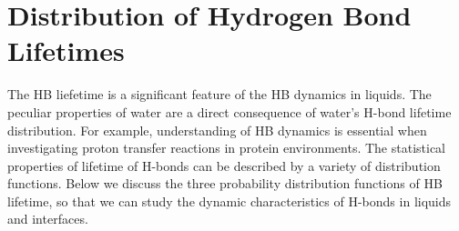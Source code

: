 \section{Distribution of Hydrogen Bond Lifetimes}
The HB liefetime is a significant feature of the HB dynamics in liquids. 
The peculiar properties of water are a direct consequence of water's H-bond lifetime distribution.\cite{Lee2007,Sciortino1989,Sciortino1990prl} 
For example, understanding of HB dynamics is essential when investigating proton transfer reactions in protein environments.\cite{Ishikita2013}  
The statistical properties of lifetime of H-bonds can be described by a variety of distribution functions.{\cite{Rapaport1983, Tanaka1983, Geiger1984,Naberukhin2009}
Below we discuss the three probability distribution functions of HB lifetime, so that we can study the dynamic characteristics of H-bonds in liquids and interfaces.
%
}
